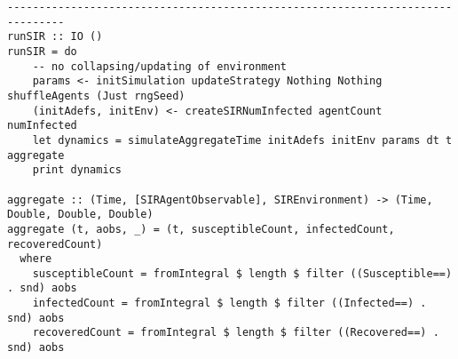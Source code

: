 \begin{verbatim}
-------------------------------------------------------------------------------
runSIR :: IO ()
runSIR = do
    -- no collapsing/updating of environment
    params <- initSimulation updateStrategy Nothing Nothing shuffleAgents (Just rngSeed)
    (initAdefs, initEnv) <- createSIRNumInfected agentCount numInfected
    let dynamics = simulateAggregateTime initAdefs initEnv params dt t aggregate
    print dynamics
	
aggregate :: (Time, [SIRAgentObservable], SIREnvironment) -> (Time, Double, Double, Double)
aggregate (t, aobs, _) = (t, susceptibleCount, infectedCount, recoveredCount)
  where
    susceptibleCount = fromIntegral $ length $ filter ((Susceptible==) . snd) aobs
    infectedCount = fromIntegral $ length $ filter ((Infected==) . snd) aobs
    recoveredCount = fromIntegral $ length $ filter ((Recovered==) . snd) aobs
\end{verbatim}